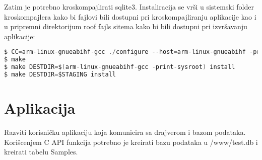 \documentclass[12pt, a4paper]{article}
\begin{document}
Zatim je potrebno kroskompajlirati sqlite3. Instaliracija se vrši u sistemski folder kroskompajlera kako bi fajlovi bili dostupni pri kroskompajliranju aplikacije kao i u pripremni direktorijum roof fajls sitema kako bi bili dostupni pri izvršavanju aplikacije:
\begin{lstlisting}[language=C]
$ CC=arm-linux-gnueabihf-gcc ./configure --host=arm-linux-gnueabihf -prefix=/usr
$ make
$ make DESTDIR=$(arm-linux-gnueabihf-gcc -print-sysroot) install
$ make DESTDIR=$STAGING install
\end{lstlisting}

\section{Aplikacija}
Razviti korisničku aplikaciju koja komunicira sa drajverom i bazom podataka. Korišcenjem C API funkcija potrebno je kreirati bazu podataka u /www/test.db i kreirati tabelu Samples.
\end{document}
